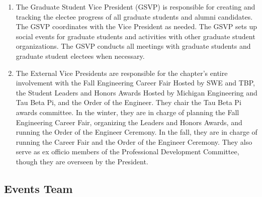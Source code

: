 \begin{enumerate}
to assist in the budgeting and spending of the Chapter.
    \item {}
    The Graduate Student Vice President (GSVP)
is responsible for creating and tracking the electee progress of all graduate students
and alumni candidates. The GSVP coordinates with the Vice President as needed.
The GSVP sets up social events for graduate students and activities with other graduate
student organizations. The GSVP conducts all meetings with graduate students
and graduate student electees when necessary.
    \item {}
    The External Vice Presidents are responsible for the
chapter’s entire involvement with the Fall Engineering Career Fair Hosted by SWE and TBP, 
the Student Leaders and Honors Awards Hosted by Michigan Engineering and Tau Beta Pi, and the Order of the Engineer. 
They chair the Tau Beta Pi awards committee. In the
winter, they are in charge of planning the Fall Engineering Career Fair, organizing the Leaders
and Honors Awards, and running the Order of the Engineer Ceremony. 
In the fall, they are in charge of running the Career Fair and the Order of the Engineer Ceremony. 
They also serve as ex officio members of the Professional Development Committee, though
they are overseen by the President.
\end{enumerate}


\subsection{Events Team} \label{F.2}


